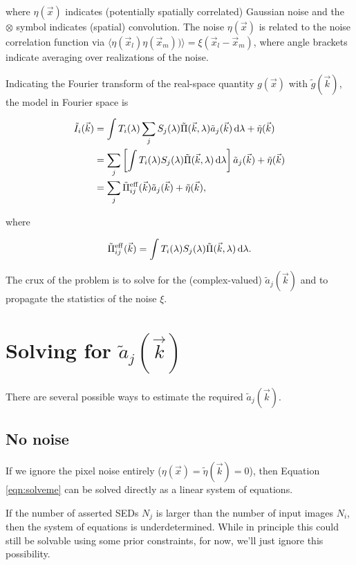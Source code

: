 \documentclass{article}
\begin{document}
where $\eta(\vec{x})$ indicates (potentially spatially correlated) Gaussian noise and the $\otimes$
symbol indicates (spatial) convolution.  The noise $\eta(\vec{x})$ is related to the noise
correlation function via $\langle\eta(\vec{x}_l) \eta(\vec{x}_m))\rangle = \xi(\vec{x}_l -
\vec{x}_m)$, where angle brackets indicate averaging over realizations of the noise.

Indicating the Fourier transform of the real-space quantity $g(\vec{x})$ with $\tilde{g}(\vec{k})$,
the model in Fourier space is

\begin{align}
    \tilde{I}_i(\vec{k})
    &= \int T_i(\lambda) \sum_j S_j(\lambda) \tilde{\Pi}(\vec{k}, \lambda) \tilde{a}_j(\vec{k}) \dif{\lambda} + \tilde{\eta}(\vec{k}) \\
    &= \sum_j \left[\int T_i(\lambda) S_j(\lambda) \tilde{\Pi}(\vec{k}, \lambda) \dif{\lambda}\right] \tilde{a}_j(\vec{k}) + \tilde{\eta}(\vec{k}) \\
    \label{eqn:solveme}
    &=  \sum_j \tilde{\Pi}^\mathrm{eff}_{ij}(\vec{k}) \tilde{a}_j(\vec{k}) + \tilde{\eta}(\vec{k}),
\end{align}

where

\begin{equation}
  \tilde{\Pi}^\mathrm{eff}_{ij}(\vec{k}) = \int T_i(\lambda) S_j(\lambda) \tilde{\Pi}(\vec{k}, \lambda) \dif{\lambda}.
\end{equation}

The crux of the problem is to solve for the (complex-valued) $\tilde{a}_j(\vec{k})$ and to propagate
the statistics of the noise $\xi$.

\section{Solving for $\tilde{a}_j(\vec{k})$}

There are several possible ways to estimate the required $\tilde{a}_j(\vec{k})$.

\subsection{No noise}

If we ignore the pixel noise entirely ($\eta(\vec{x}) = \tilde{\eta}(\vec{k})= 0$), then Equation
\ref{eqn:solveme} can be solved directly as a linear system of equations.

If the number of asserted SEDs $N_j$ is larger than the number of input images $N_i$, then the
system of equations is underdetermined.  While in principle this could still be solvable using some
prior constraints, for now, we'll just ignore this possibility.
\end{document}
